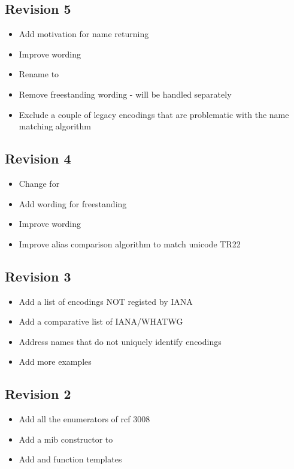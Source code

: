 \documentclass{wg21}
\begin{document}
\subsection*{Revision 5}
\begin{itemize}
    \item Add motivation for name returning 
    \item Improve wording
    \item Rename  to 
    \item Remove freestanding wording - will be handled separately
    \item Exclude a couple of legacy encodings that are problematic with the name matching algorithm
\end{itemize}

\subsection*{Revision 4}
\begin{itemize}
    \item Change  for 
    \item Add wording for freestanding
    \item Improve wording
    \item Improve alias comparison algorithm to match unicode TR22
\end{itemize}

\subsection*{Revision 3}
\begin{itemize}
    \item Add a list of encodings NOT registed by IANA
    \item Add a comparative list of IANA/WHATWG
    \item Address names that do not uniquely identify encodings
    \item Add more examples
\end{itemize}

\subsection*{Revision 2}
\begin{itemize}
    \item Add all the enumerators of rcf 3008
    \item Add a mib constructor to 
    \item Add  and  function templates
\end{itemize}
\end{document}
